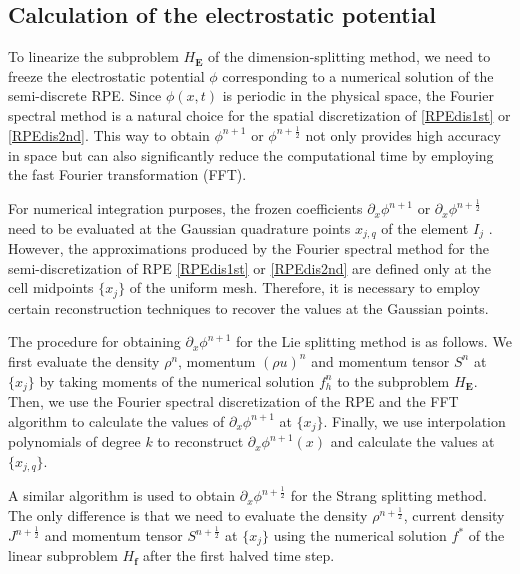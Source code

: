 \documentclass[letterpaper,10pt]{article}
\numberwithin{equation}{section}
\numberwithin{figure}{section}
\numberwithin{table}{section}
\begin{document}
    
\subsection{Calculation of the electrostatic potential}\label{sec:phi}
\hspace{4pt}
To linearize the subproblem $H_{\mathbf{E}}$ of the dimension-splitting method, we need to freeze the electrostatic potential $\phi$ corresponding to a numerical solution of the semi-discrete RPE.
Since $\phi(x,t)$ is periodic in the physical space, the Fourier spectral method is a natural choice for the spatial discretization of \eqref{RPEdis1st} or \eqref{RPEdis2nd}. This way to obtain $\phi^{n+1}$ or $\phi^{n+\frac{1}{2}}$  not only provides high accuracy in space but can also significantly reduce the computational time by employing the fast Fourier transformation (FFT).

For numerical integration purposes, the frozen coefficients $\partial_x\phi^{n+1}$ or $\partial_x\phi^{n+\frac{1}{2}}$ need to be evaluated at the Gaussian quadrature points $x_{j,q}$ of the element $I_j$ \cite{QIU2011DG}. However, the approximations produced by the Fourier spectral method for the semi-discretization of RPE \eqref{RPEdis1st} or \eqref{RPEdis2nd} are defined only at the cell midpoints $\{x_j\}$ of the uniform mesh. Therefore, it is necessary to employ certain reconstruction techniques to recover the values at the Gaussian points. 

The procedure for obtaining $\partial_x\phi^{n+1}$ for the Lie splitting method is as follows. We first evaluate the density $\rho^n$, momentum $(\rho u)^n$ and momentum tensor $S^n$ at $\{x_j\}$ by taking moments of the numerical solution $f_h^n$ to the subproblem $H_{\mathbf{E}}$. Then, we use the Fourier spectral discretization of the RPE and the FFT algorithm to calculate the values of $\partial_x\phi^{n+1}$ at $\{x_j\}$. Finally, we use interpolation polynomials of degree $k$ to reconstruct $\partial_x\phi^{n+1}(x)$ and calculate the values at $\{x_{j,q}\}$.

A similar algorithm is used to obtain $\partial_x\phi^{n+\frac{1}{2}}$ for the Strang splitting method. The only difference is that we need to evaluate the density $\rho^{n+\frac{1}{2}}$, current density $J^{n+\frac{1}{2}}$ and momentum tensor $S^{n+\frac{1}{2}}$ at $\{x_j\}$ using the numerical solution $f^{*}$ of the linear subproblem $H_{\mathbf{f}}$ after the first halved time step.
\end{document}
